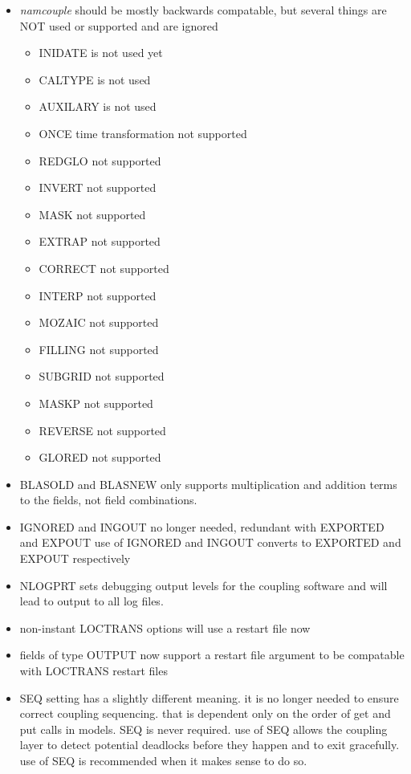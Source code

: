 \begin{itemize}
\begin{itemize}
\item {\it namcouple} should be mostly backwards compatable, but several things
  are NOT used or supported and are ignored
\begin{itemize}
  \item INIDATE is not used yet
  \item CALTYPE is not used
  \item AUXILARY is not used
  \item ONCE time transformation not supported
  \item REDGLO not supported
  \item INVERT not supported
  \item MASK not supported
  \item EXTRAP not supported
  \item CORRECT not supported
  \item INTERP not supported
  \item MOZAIC not supported
  \item FILLING not supported
  \item SUBGRID not supported
  \item MASKP not supported
  \item REVERSE not supported
  \item GLORED not supported
\end{itemize}
\item BLASOLD and BLASNEW only supports multiplication and addition
  terms to the fields, not field combinations.
\item IGNORED and INGOUT no longer needed, redundant with EXPORTED and EXPOUT
  use of IGNORED and INGOUT converts to EXPORTED and EXPOUT respectively
\item NLOGPRT sets debugging output levels for the coupling software
  and will lead to output to all log files.
\item non-instant LOCTRANS options will use a restart file now
\item fields of type OUTPUT now support a restart file argument to be
  compatable with LOCTRANS restart files
\item SEQ setting has a slightly different meaning.  it is no longer
  needed to ensure correct coupling sequencing.  that is dependent
  only on the order of get and put calls in models.  SEQ is never
  required.  use of SEQ allows the coupling layer to detect
  potential deadlocks before they happen and to exit gracefully.
  use of SEQ is recommended when it makes sense to do so.

\end{itemize}
\end{itemize}
